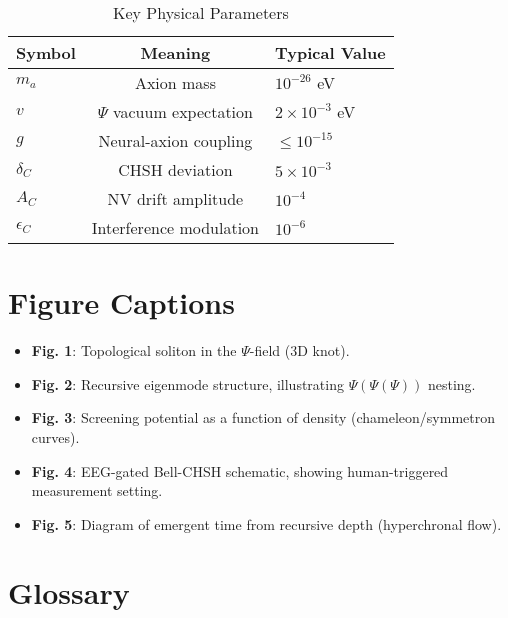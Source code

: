 \documentclass[aps,prx,twocolumn,nofootinbib,superscriptaddress,longbibliography]{revtex4-2}
\begin{document}
\begin{table}[h]
    \centering
    \caption{Key Physical Parameters}
    \begin{tabular}{lcl}
        \hline
        \textbf{Symbol} & \textbf{Meaning} & \textbf{Typical Value} \\
        \hline
        $m_a$ & Axion mass & $10^{-26}$ eV \\
        $v$ & $\Psi$ vacuum expectation & $2 \times 10^{-3}$ eV \\
        $g$ & Neural-axion coupling & $\leq 10^{-15}$ \\
        $\delta_C$ & CHSH deviation & $5 \times 10^{-3}$ \\
        $A_C$ & NV drift amplitude & $10^{-4}$ \\
        $\epsilon_C$ & Interference modulation & $10^{-6}$ \\
        \hline
    \end{tabular}
\end{table}

\section{Figure Captions}

\begin{itemize}
    \item \textbf{Fig. 1}: Topological soliton in the $\Psi$-field (3D knot).
    \item \textbf{Fig. 2}: Recursive eigenmode structure, illustrating $\Psi(\Psi(\Psi))$ nesting.
    \item \textbf{Fig. 3}: Screening potential as a function of density (chameleon/symmetron curves).
    \item \textbf{Fig. 4}: EEG-gated Bell-CHSH schematic, showing human-triggered measurement setting.
    \item \textbf{Fig. 5}: Diagram of emergent time from recursive depth (hyperchronal flow).
\end{itemize}

\section{Glossary}
\end{document}

